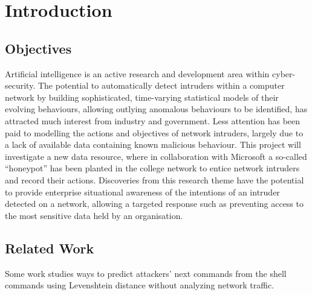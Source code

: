 \chapter{Introduction}
\section{Objectives}
Artificial intelligence is an active research and development area within cyber-security. 
The potential to automatically detect intruders within a computer network by building sophisticated, 
time-varying statistical models of their evolving behaviours, 
allowing outlying anomalous behaviours to be identified, 
has attracted much interest from industry and government. 
Less attention has been paid to modelling the actions and objectives of network intruders,
largely due to a lack of available data containing known malicious behaviour.
This project will investigate a new data resource, 
where in collaboration with Microsoft a so-called “honeypot” has been planted in the college network 
to entice network intruders and record their actions. 
Discoveries from this research theme have the potential 
to provide enterprise situational awareness of the intentions of an intruder detected on a network, 
allowing a targeted response such as preventing access to the most sensitive data held by an organisation.

\section{Related Work}
Some work \cite{sadique2021analysis}studies ways to predict attackers' next commands from the shell commands
using Levenshtein distance without analyzing network traffic.